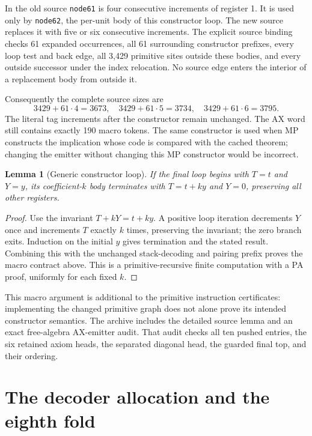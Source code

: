 \documentclass[10pt,letterpaper]{article}
\newtheorem{lemma}[theorem]{Lemma}
\newcommand{\file}[1]{\nolinkurl{#1}}
\begin{document}
In the old source \file{node61} is four consecutive increments of register 1. It is used only by \file{node62}, the per-unit body of this constructor loop. The new source replaces it with five or six consecutive increments. The explicit source binding checks 61 expanded occurrences, all 61 surrounding constructor prefixes, every loop test and back edge, all 3,429 primitive sites outside these bodies, and every outside successor under the index relocation. No source edge enters the interior of a replacement body from outside it.

Consequently the complete source sizes are
\[
 3429+61\cdot4=3673,\quad
 3429+61\cdot5=3734,\quad
 3429+61\cdot6=3795.
\]
The literal tag increments after the constructor remain unchanged. The AX word still contains exactly 190 macro tokens. The same constructor is used when MP constructs the implication whose code is compared with the cached theorem; changing the emitter without changing this MP constructor would be incorrect.

\begin{lemma}[Generic constructor loop]
If the final loop begins with $T=t$ and $Y=y$, its coefficient-$k$ body terminates with $T=t+ky$ and $Y=0$, preserving all other registers.
\end{lemma}
\begin{proof}
Use the invariant $T+kY=t+ky$. A positive loop iteration decrements $Y$ once and increments $T$ exactly $k$ times, preserving the invariant; the zero branch exits. Induction on the initial $y$ gives termination and the stated result. Combining this with the unchanged stack-decoding and pairing prefix proves the macro contract above. This is a primitive-recursive finite computation with a PA proof, uniformly for each fixed $k$.
\end{proof}

This macro argument is additional to the primitive instruction certificates: implementing the changed primitive graph does not alone prove its intended constructor semantics. The archive includes the detailed source lemma and an exact free-algebra AX-emitter audit. That audit checks all ten pushed entries, the six retained axiom heads, the separated diagonal head, the guarded final top, and their ordering.

\section{The decoder allocation and the eighth fold}
\label{sec:fold}
\end{document}
